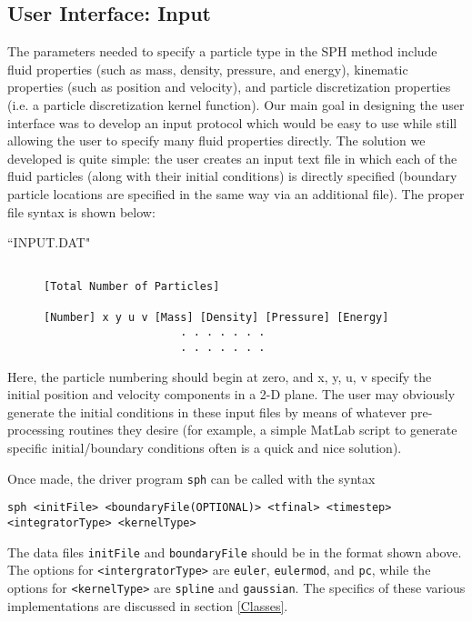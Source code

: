 \documentclass[11pt]{article}
\begin{document}
\subsection{User Interface: Input}

The parameters needed to specify a particle type in the SPH method include fluid properties (such as mass, density, pressure, and energy), kinematic properties (such as position and velocity), and particle discretization properties (i.e. a particle discretization kernel function). Our main goal in designing the user interface was to develop an input protocol which would be easy to use while still allowing the user to specify many fluid properties directly. The solution we developed is quite simple: the user creates an input text file in which each of the fluid particles (along with their initial conditions) is directly specified (boundary particle locations are specified in the same way via an additional file). The proper file syntax is shown below:
%
\begin{description}
	\item[``INPUT.DAT"]
		\begin{verbatim}

[Total Number of Particles]

[Number] x y u v [Mass] [Density] [Pressure] [Energy]
                     . . . . . . .
                     . . . . . . .
		\end{verbatim}
\end{description}
 
Here, the particle numbering should begin at zero, and {x, y, u, v} specify the initial position and velocity components in a 2-D plane. The user may obviously generate the initial conditions in these input files by means of whatever pre-processing routines they desire (for example, a simple MatLab script to generate specific initial/boundary conditions often is a quick and nice solution).

Once made, the driver program \texttt{sph} can be called with the syntax
\begin{center} \texttt{sph <initFile> <boundaryFile(OPTIONAL)> <tfinal> <timestep> <integratorType> <kernelType>} \end{center}
The data files \texttt{initFile} and \texttt{boundaryFile} should be in the format shown above. The options for \texttt{<intergratorType>} are \texttt{euler}, \texttt{eulermod}, and \texttt{pc}, while the options for \texttt{<kernelType>} are \texttt{spline} and \texttt{gaussian}. The specifics of these various implementations are discussed in section \ref{Classes}.
\end{document}
